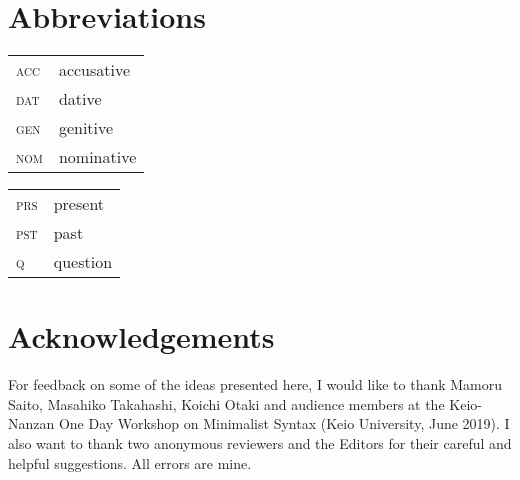 \documentclass[
    output=paper,
    colorlinks,
    citecolor=brown,
]{langscibook}
\begin{document}
\section*{Abbreviations}
\begin{tabularx}{.5\textwidth}{lQ}
\textsc{acc} & accusative  \\
\textsc{dat} & dative     \\
\textsc{gen} & genitive  \\
\textsc{nom} & nominative \\        
\end{tabularx}
\begin{tabularx}{.5\textwidth}{lQ}
\textsc{prs} & present  \\
\textsc{pst} & past     \\
\textsc{q}   & question \\
\end{tabularx}

\section*{Acknowledgements}

For feedback on some of the ideas presented here, I would like to thank Mamoru Saito, Masahiko Takahashi, Koichi Otaki and audience members at the Keio-Nanzan One Day Workshop on Minimalist Syntax (Keio University, June 2019). I also want to thank two anonymous reviewers and the Editors for their careful and helpful suggestions. All errors are mine. 

{\sloppy
    \printbibliography[heading=subbibliography,notkeyword=this]
}
\end{document}
